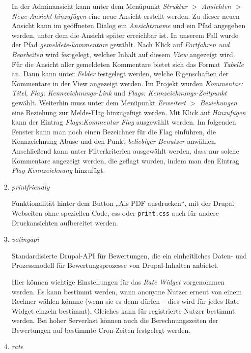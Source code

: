 \documentclass[a4paper,11pt,twoside]{article}
\begin{document}
\begin{enumerate}
In der Adminansicht kann unter dem Menüpunkt \textit{Struktur $>$ Ansichten
  $>$ Neue Ansicht hinzufügen} eine neue Ansicht erstellt werden. Zu dieser
neuen Ansicht kann im geöffneten Dialog ein \textit{Ansichtsname} und ein Pfad
angegeben werden, unter dem die Ansicht später erreichbar ist.  In unserem
Fall wurde der Pfad \textit{gemeldete-kommentare} gewählt. Nach Klick auf
\textit{Fortfahren und Bearbeiten} wird festgelegt, welcher Inhalt auf diesem
\textit{View} angezeigt wird. Für die Ansicht aller gemeldeten Kommentare
bietet sich das Format \textit{Tabelle} an. Dann kann unter \textit{Felder}
festgelegt werden, welche Eigenschaften der Kommentare in der View angezeigt
werden. Im Projekt wurden \textit{Kommentar: Titel}, \textit{Flag:
  Kennzeichnungs-Link} und \textit{Flags: Kennzeichnungs-Zeitpunkt}
gewählt. Weiterhin muss unter dem Menüpunkt \textit{Erweitert $>$ Beziehungen}
eine Beziehung zur Melde-Flag hinzugefügt werden. Mit Klick auf
\textit{Hinzufügen} kann der Eintrag \textit{Flags:Kommentar Flag} ausgewählt
werden. Im folgenden Fenster kann man noch einen Bezeichner für die Flag
einführen, die Kennzeichnung Abuse und den Punkt \textit{beliebiger Benutzer}
anwählen. Anschließend kann unter Filterkriterien ausgewählt werden, dass nur
solche Kommentare angezeigt werden, die geflagt wurden, indem man den Eintrag
\textit{Flag Kennzeichnung} hinzufügt.
\pagebreak[3]

\item \emph{printfriendly}

Funktionalität hinter dem Button „Als PDF ausdrucken“, mit der Drupal Webseiten
ohne speziellen Code, css oder \texttt{print.css} auch für andere
Druckansichten aufbereitet werden.

\item \emph{votingapi}

Standardisierte Drupal-API für Bewertungen, die ein einheitliches Daten- und
Prozessmodell für Bewertungsprozesse von Drupal-Inhalten anbietet.

Hier können wichtige Einstellungen für das \emph{Rate Widget} vorgenommen
werden.  Es kann bestimmt werden, wann anonyme Nutzer erneut von einem Rechner
wählen könnne (wenn sie es denn dürfen -- dies wird für jedes Rate Widget
einzeln bestimmt).  Gleiches kann für registrierte Nutzer bestimmt werden. Bei
hoher Serverlast können auch die Berechnungszeiten der Bewertungen auf
bestimmte Cron-Zeiten festgelegt werden.

\item \emph{rate}


\end{enumerate}
\end{document}
